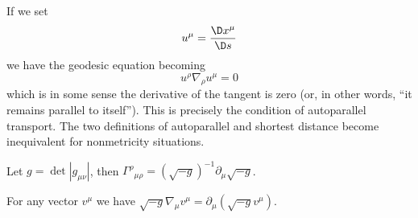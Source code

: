 If we set
\begin{equation}
u^{\mu}=\frac{\D x^{\mu}}{\D s}
\end{equation}
we have the geodesic equation becoming
\begin{equation}
u^{\rho}\nabla_{\rho}u^{\mu}=0
\end{equation}
which is in some sense the derivative of the tangent is zero (or,
in other words, ``it remains parallel to itself''). This is
precisely the condition of autoparallel transport. The two
definitions of autoparallel and shortest distance become
inequivalent for nonmetricity situations. 

\begin{prop}
Let $g=\det|g_{\mu\nu}|$, then ${\Gamma^{\rho}}_{\mu\rho}=(\sqrt{-g})^{-1}\partial_{\mu}\sqrt{-g}$.
\end{prop}
\begin{prop}
For any vector $v^{\mu}$ we have $\sqrt{-g}\nabla_{\mu}v^{\mu}=\partial_{\mu}(\sqrt{-g}v^{\mu})$.
\end{prop}
